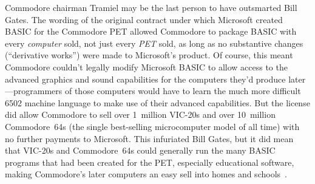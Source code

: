 \begin{tangent}
Commodore chairman Tramiel may be the last person to have outsmarted
Bill Gates.
The wording of the original contract under which Microsoft created
BASIC for the Commodore PET allowed Commodore
to package BASIC with every \emph{computer} sold, not just every
\emph{PET} sold, as long as no substantive changes (``derivative
works'') were made to Microsoft's product.
Of course, this meant Commodore couldn't legally modify Microsoft
BASIC to allow access to the advanced graphics and sound capabilities
for the computers they'd produce later---programmers of those
computers would have to learn the much
more difficult 6502 machine language to make use of their
advanced capabilities.
But the license did allow Commodore to sell over 1~million VIC-20s and over
10~million Commodore~64s (the single best-selling microcomputer
model of all time) with no further payments to Microsoft.
This infuriated Bill Gates, but it did mean that VIC-20s and
Commodore~64s could generally run the many BASIC programs that had
been created for the PET, especially educational software, making
Commodore's later
computers an easy sell into homes and
schools~\cite[p. 414]{commodore}.
\end{tangent}

